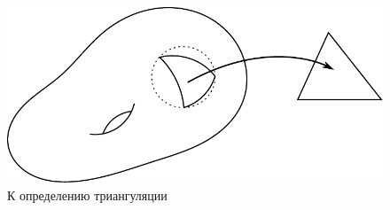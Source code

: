 \begin{figure}[htbp]
    \centering
    \includegraphics[scale=1]{images/c10.1.pdf}
    \caption{К определению триангуляции}
    \label{fig:c10.1}
\end{figure}

